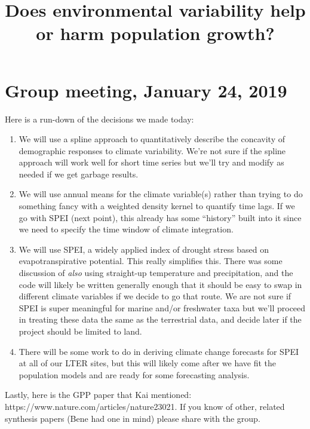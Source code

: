 \documentclass{article}
\title{Does environmental variability help or harm population growth?}
\begin{document}
  \maketitle

\section{Group meeting, January 24, 2019}
Here is a run-down of the decisions we made today:
\begin{enumerate}
\item{We will use a spline approach to quantitatively describe the concavity of demographic responses to climate variability. We’re not sure if the spline approach will work well for short time series but we’ll try and modify as needed if we get garbage results. }
\item{We will use annual means for the climate variable(s) rather than trying to do something fancy with a weighted density kernel to quantify time lags. If we go with SPEI (next point), this already has some “history” built into it since we need to specify the time window of climate integration.}
\item{We will use SPEI, a widely applied index of drought stress based on evapotranspirative potential. This really simplifies this. There was some discussion of \textit{also} using straight-up temperature and precipitation, and the code will likely be written generally enough that it should be easy to swap in different climate variables if we decide to go that route. We are not sure if SPEI is super meaningful for marine and/or freshwater taxa but we’ll proceed in treating these data the same as the terrestrial data, and decide later if the project should be limited to land.}
\item{There will be some work to do in deriving climate change forecasts for SPEI at all of our LTER sites, but this will likely come after we have fit the population models and are ready for some forecasting analysis.}
\end{enumerate}

Lastly, here is the GPP paper that Kai mentioned: https://www.nature.com/articles/nature23021. If you know of other, related synthesis papers (Bene had one in mind) please share with the group. 
\end{document}
